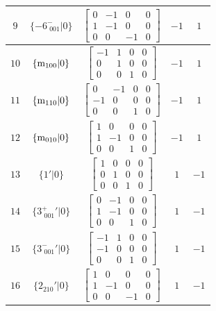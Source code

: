\documentclass[fleqn,8pt]{jsarticle}
\begin{document}
\begin{longtable}{ccccc}
$ 9 $ & $ \{-6^{-}_{\,\,001}|0\} $ & $ \begin{bmatrix} 0 & -1 & 0 & 0 \\ 1 & -1 & 0 & 0 \\ 0 & 0 & -1 & 0 \end{bmatrix} $ & $ -1 $ & $ 1 $ \\ \hline
$ 10 $ & $ \{{\rm m}_{100}|0\} $ & $ \begin{bmatrix} -1 & 1 & 0 & 0 \\ 0 & 1 & 0 & 0 \\ 0 & 0 & 1 & 0 \end{bmatrix} $ & $ -1 $ & $ 1 $ \\ \hline
$ 11 $ & $ \{{\rm m}_{110}|0\} $ & $ \begin{bmatrix} 0 & -1 & 0 & 0 \\ -1 & 0 & 0 & 0 \\ 0 & 0 & 1 & 0 \end{bmatrix} $ & $ -1 $ & $ 1 $ \\ \hline
$ 12 $ & $ \{{\rm m}_{010}|0\} $ & $ \begin{bmatrix} 1 & 0 & 0 & 0 \\ 1 & -1 & 0 & 0 \\ 0 & 0 & 1 & 0 \end{bmatrix} $ & $ -1 $ & $ 1 $ \\ \hline
$ 13 $ & $ \{1{}'|0\} $ & $ \begin{bmatrix} 1 & 0 & 0 & 0 \\ 0 & 1 & 0 & 0 \\ 0 & 0 & 1 & 0 \end{bmatrix} $ & $ 1 $ & $ -1 $ \\ \hline
$ 14 $ & $ \{3^{+}_{\,\,001}{}'|0\} $ & $ \begin{bmatrix} 0 & -1 & 0 & 0 \\ 1 & -1 & 0 & 0 \\ 0 & 0 & 1 & 0 \end{bmatrix} $ & $ 1 $ & $ -1 $ \\ \hline
$ 15 $ & $ \{3^{-}_{\,\,001}{}'|0\} $ & $ \begin{bmatrix} -1 & 1 & 0 & 0 \\ -1 & 0 & 0 & 0 \\ 0 & 0 & 1 & 0 \end{bmatrix} $ & $ 1 $ & $ -1 $ \\ \hline
$ 16 $ & $ \{2{}_{210}{}'|0\} $ & $ \begin{bmatrix} 1 & 0 & 0 & 0 \\ 1 & -1 & 0 & 0 \\ 0 & 0 & -1 & 0 \end{bmatrix} $ & $ 1 $ & $ -1 $ \\ \hline

\end{longtable}
\end{document}
